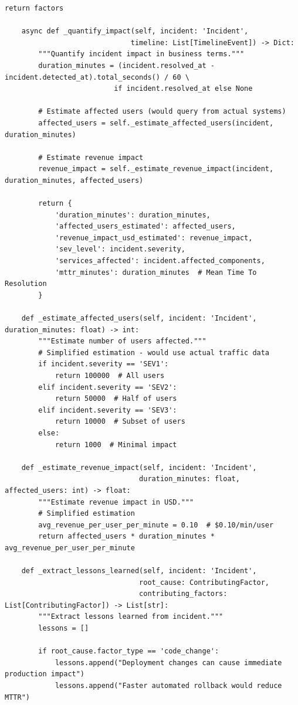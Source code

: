 \begin{lstlisting}[style=python, caption={Post-incident analysis with root cause identification}]
        return factors

    async def _quantify_impact(self, incident: 'Incident',
                              timeline: List[TimelineEvent]) -> Dict:
        """Quantify incident impact in business terms."""
        duration_minutes = (incident.resolved_at - incident.detected_at).total_seconds() / 60 \
                          if incident.resolved_at else None

        # Estimate affected users (would query from actual systems)
        affected_users = self._estimate_affected_users(incident, duration_minutes)

        # Estimate revenue impact
        revenue_impact = self._estimate_revenue_impact(incident, duration_minutes, affected_users)

        return {
            'duration_minutes': duration_minutes,
            'affected_users_estimated': affected_users,
            'revenue_impact_usd_estimated': revenue_impact,
            'sev_level': incident.severity,
            'services_affected': incident.affected_components,
            'mttr_minutes': duration_minutes  # Mean Time To Resolution
        }

    def _estimate_affected_users(self, incident: 'Incident', duration_minutes: float) -> int:
        """Estimate number of users affected."""
        # Simplified estimation - would use actual traffic data
        if incident.severity == 'SEV1':
            return 100000  # All users
        elif incident.severity == 'SEV2':
            return 50000  # Half of users
        elif incident.severity == 'SEV3':
            return 10000  # Subset of users
        else:
            return 1000  # Minimal impact

    def _estimate_revenue_impact(self, incident: 'Incident',
                                duration_minutes: float, affected_users: int) -> float:
        """Estimate revenue impact in USD."""
        # Simplified estimation
        avg_revenue_per_user_per_minute = 0.10  # $0.10/min/user
        return affected_users * duration_minutes * avg_revenue_per_user_per_minute

    def _extract_lessons_learned(self, incident: 'Incident',
                                root_cause: ContributingFactor,
                                contributing_factors: List[ContributingFactor]) -> List[str]:
        """Extract lessons learned from incident."""
        lessons = []

        if root_cause.factor_type == 'code_change':
            lessons.append("Deployment changes can cause immediate production impact")
            lessons.append("Faster automated rollback would reduce MTTR")


\end{lstlisting}
